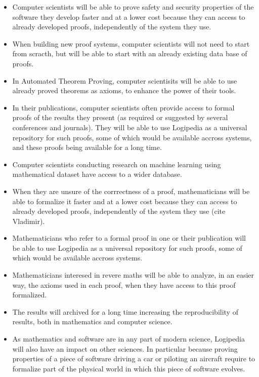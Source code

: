 \begin{itemize}

\item Computer scientists will be able to prove safety and security
  properties of the software they develop faster and at a lower cost
  because they can access to already developed proofs, independently
  of the system they use.

\item When building new proof systems, computer scientists will not
  need to start from scracth, but will be able to start with an already
  existing data base of proofs.

\item In Automated Theorem Proving, computer scientisits will be able
  to use already proved theorems as axioms, to enhance the power of
  their tools.

\item In their publications, computer scientists often provide access
  to formal proofs of the results they present (as required or
  suggested by several conferences and journals). They will be able to
  use Logipedia as a universal repository for such proofs, some of
  which would be available accross systems, and these proofs being
  available for a long time.

\item Computer scientists conducting research on machine learning using
mathematical dataset have access to a wider database.

\item When they are unsure of the corrrectness of a proof, mathematicians
will be able to formalize it faster and at a lower cost because they
can access to already developed proofs, independently of the system
they use (cite Vladimir).

\item Mathematicians who refer to a formal proof in one or their publication
will be able to use Logipedia as a universal repository for such
proofs, some of which would be available accross systems.

\item Mathematicians interesed in revere maths will be able to analyze, in
an easier way, the axioms used in each proof, when they have access to
this proof formalized.

\item The results will archived for a long time increasing the
  reproducibility of results, both in mathematics and computer science.

\item As mathematics and software are in any part of modern science,
  {\sf Logipedia} will also have an impact on other sciences. In
  particular because proving properties of a piece of software driving
  a car or piloting an aircraft require to formalize part of the
  physical world in which this piece of software evolves.
\end{itemize}
  
